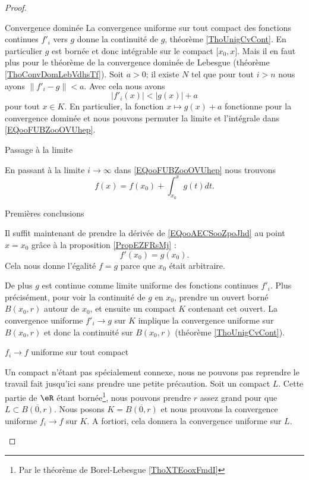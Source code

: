 \begin{normaltext}
\begin{proof}
\begin{subproof}
    \item[Convergence dominée]
        La convergence uniforme sur tout compact des fonctions continues \( f'_i\) vers \( g\) donne la continuité de \( g\), théorème \ref{ThoUnigCvCont}. En particulier \( g\) est bornée et donc intégrable sur le compact \( \mathopen[ x_0 , x \mathclose]\). Mais il en faut plus pour le théorème de la convergence dominée de Lebesgue (théorème \ref{ThoConvDomLebVdhsTf}). Soit \( a>0\); il existe \( N\) tel que pour tout \( i>n\) nous ayons \( \| f'_i-g \|<a\). Avec cela nous avons
        \begin{equation}
            | f'_i(x) |<| g(x) |+a
        \end{equation}
        pour tout \( x\in K\). En particulier, la fonction \( x\mapsto g(x)+a\) fonctionne pour la convergence dominée et nous pouvons permuter la limite et l'intégrale dans \eqref{EQooFUBZooOVUhep}.

    \item[Passage à la limite]

        En passant à la limite \( i\to \infty\) dans \eqref{EQooFUBZooOVUhep} nous trouvons
        \begin{equation}        \label{EQooAECSooZpoJhd}
            f(x)=f(x_0)+\int_{x_0}^xg(t)dt.
        \end{equation}
    \item[Premières conclusions]

        Il suffit maintenant de prendre la dérivée de \eqref{EQooAECSooZpoJhd} au point \( x=x_0\) grâce à la proposition \ref{PropEZFRsMj} :
        \begin{equation}
            f'(x_0)=g(x_0).
        \end{equation}
        Cela nous donne l'égalité \( f=g\) parce que \( x_0\) était arbitraire.

        De plus \( g\) est continue comme limite uniforme des fonctions continues \( f'_i\). Plus précisément, pour voir la continuité de \( g\) en \( x_0\), prendre un ouvert borné \( B(x_0,r)\) autour de \( x_0\), et ensuite un compact \( K\) contenant cet ouvert. La convergence uniforme \( f'_i\to g\) sur \( K\) implique la convergence uniforme sur \( B(x_0,r)\) et donc la continuité sur \( B(x_0,r)\) (théorème \ref{ThoUnigCvCont}).

    \item[\( f_i\to f\) uniforme sur tout compact]

        Un compact n'étant pas spécialement connexe, nous ne pouvons pas reprendre le travail fait jusqu'ici sans prendre une petite précaution. Soit un compact \( L\). Cette partie de \( \eR\) étant bornée\footnote{Par le théorème de Borel-Lebesgue \ref{ThoXTEooxFmdI}}, nous pouvons prendre \( r\) assez grand pour que \( L\subset \overline{ B(0,r) }\). Nous posons \( K=\overline{ B(0,r) }\) et nous prouvons la convergence uniforme \( f_i\to f\) sur \( K\). A fortiori, cela donnera la convergence uniforme sur \( L\).


\end{subproof}
\end{proof}
\end{normaltext}
